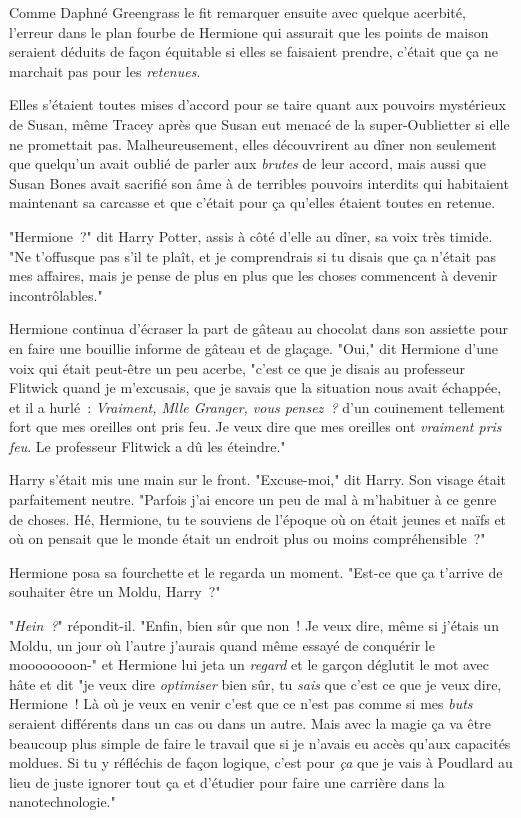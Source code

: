 \later

Comme Daphné Greengrass le fit remarquer ensuite avec quelque acerbité, l'erreur dans le plan fourbe de Hermione qui assurait que les points de maison seraient déduits de façon équitable si elles se faisaient prendre, c'était que ça ne marchait pas pour les \emph{retenues}.

Elles s'étaient toutes mises d'accord pour se taire quant aux pouvoirs mystérieux de Susan, même Tracey après que Susan eut menacé de la super-Oublietter si elle ne promettait pas. Malheureusement, elles découvrirent au dîner non seulement que quelqu'un avait oublié de parler aux \emph{brutes} de leur accord, mais aussi que Susan Bones avait sacrifié son âme à de terribles pouvoirs interdits qui habitaient maintenant sa carcasse et que c'était pour ça qu'elles étaient toutes en retenue.

"Hermione~?" dit Harry Potter, assis à côté d'elle au dîner, sa voix très timide. "Ne t'offusque pas s'il te plaît, et je comprendrais si tu disais que ça n'était pas mes affaires, mais je pense de plus en plus que les choses commencent à devenir incontrôlables."

Hermione continua d'écraser la part de gâteau au chocolat dans son assiette pour en faire une bouillie informe de gâteau et de glaçage. "Oui," dit Hermione d'une voix qui était peut-être un peu acerbe, "c'est ce que je disais au professeur Flitwick quand je m'excusais, que je savais que la situation nous avait échappée, et il a hurlé~: \emph{Vraiment, Mlle Granger, vous pensez~?} d'un couinement tellement fort que mes oreilles ont pris feu. Je veux dire que mes oreilles ont \emph{vraiment pris feu}. Le professeur Flitwick a dû les éteindre."

Harry s'était mis une main sur le front. "Excuse-moi," dit Harry. Son visage était parfaitement neutre. "Parfois j'ai encore un peu de mal à m'habituer à ce genre de choses. Hé, Hermione, tu te souviens de l'époque où on était jeunes et naïfs et où on pensait que le monde était un endroit plus ou moins compréhensible~?"

Hermione posa sa fourchette et le regarda un moment. "Est-ce que ça t'arrive de souhaiter être un Moldu, Harry~?"

"\emph{Hein~?}" répondit-il. "Enfin, bien sûr que non~! Je veux dire, même si j'étais un Moldu, un jour où l'autre j'aurais quand même essayé de conquérir le moooooooon-" et Hermione lui jeta un \emph{regard} et le garçon déglutit le mot avec hâte et dit "je veux dire \emph{optimiser} bien sûr, tu \emph{sais} que c'est ce que je veux dire, Hermione~! Là où je veux en venir c'est que ce n'est pas comme si mes \emph{buts} seraient différents dans un cas ou dans un autre. Mais avec la magie ça va être beaucoup plus simple de faire le travail que si je n'avais eu accès qu'aux capacités moldues. Si tu y réfléchis de façon logique, c'est pour \emph{ça} que je vais à Poudlard au lieu de juste ignorer tout ça et d'étudier pour faire une carrière dans la nanotechnologie."

